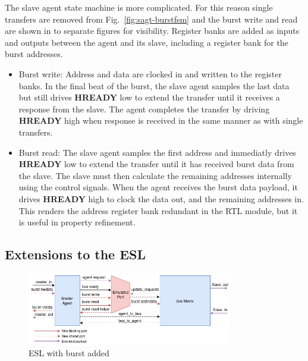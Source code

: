 The slave agent state machine is more complicated. For this reason single transfers are removed from Fig.~\ref{fig:sagt-burstfsm} and the burst write and read are shown in to separate figures for visibility. Register banks are added as inputs and outputs between the agent and its slave, including a register bank for the burst addresses. 
\begin{itemize}
 \item Burst write: Address and data are clocked in and written to the register banks. In the final beat of the burst, the slave agent samples the last data but still drives \textbf{HREADY} low to extend the transfer until it receives a response from the slave. The agent completes the transfer by driving \textbf{HREADY} high when response is received in the same manner as with single transfers.
 \item Burst read: The slave agent samples the first address and immediatly drives \textbf{HREADY} low to extend the transfer until it has received burst data from the slave. The slave must then calculate the remaining addresses internally using the control signals. When the agent receives the burst data payload, it drives \textbf{HREADY} high to clock the data out, and the remaining addresses in. This renders the address register bank redundant in the RTL module, but it is useful in property refinement.  
\end{itemize}

\subsection{Extensions to the ESL}
\begin{figure}[hbt]
    \begin{center}
        \includegraphics[width=0.8\textwidth]{figs/ESL/burst_esl.png}
    \end{center}
    \caption{ESL with burst added}
    \label{fig:esl-burst}
\end{figure}

